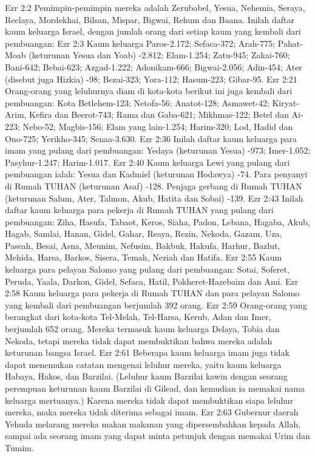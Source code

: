 Ezr 2:2  Pemimpin-pemimpin mereka adalah Zerubabel, Yesua, Nehemia, Seraya, Reelaya, Mordekhai, Bilsan, Mispar, Bigwai, Rehum dan Baana. Inilah daftar kaum keluarga Israel, dengan jumlah orang dari setiap kaum yang kembali dari pembuangan:
Ezr 2:3  Kaum keluarga Paros-2.172; Sefaca-372; Arah-775; Pahat-Moab (keturunan Yesua dan Yoab) -2.812; Elam-1.254; Zatu-945; Zakai-760; Bani-642; Bebai-623; Azgad-1.222; Adonikam-666; Bigwai-2.056; Adin-454; Ater (disebut juga Hizkia) -98; Bezai-323; Yora-112; Hasum-223; Gibar-95.
Ezr 2:21  Orang-orang yang leluhurnya diam di kota-kota berikut ini juga kembali dari pembuangan: Kota Betlehem-123; Netofa-56; Anatot-128; Asmawet-42; Kiryat-Arim, Kefira dan Beerot-743; Rama dan Gaba-621; Mikhmas-122; Betel dan Ai-223; Nebo-52; Magbis-156; Elam yang lain-1.254; Harim-320; Lod, Hadid dan Ono-725; Yerikho-345; Senaa-3.630.
Ezr 2:36  Inilah daftar kaum keluarga para imam yang pulang dari pembuangan: Yedaya (keturunan Yesua) -973; Imer-1.052; Pasyhur-1.247; Harim-1.017.
Ezr 2:40  Kaum keluarga Lewi yang pulang dari pembuangan ialah: Yesua dan Kadmiel (keturunan Hodawya) -74. Para penyanyi di Rumah TUHAN (keturunan Asaf) -128. Penjaga gerbang di Rumah TUHAN (keturunan Salum, Ater, Talmon, Akub, Hatita dan Sobai) -139.
Ezr 2:43  Inilah daftar kaum keluarga para pekerja di Rumah TUHAN yang pulang dari pembuangan: Ziha, Hasufa, Tabaot, Keros, Siaha, Padon, Lebana, Hagaba, Akub, Hagab, Samlai, Hanan, Gidel, Gahar, Reaya, Rezin, Nekoda, Gazam, Uza, Paseah, Besai, Asna, Meunim, Nefusim, Bakbuk, Hakufa, Harhur, Bazlut, Mehida, Harsa, Barkos, Sisera, Temah, Neziah dan Hatifa.
Ezr 2:55  Kaum keluarga para pelayan Salomo yang pulang dari pembuangan: Sotai, Soferet, Peruda, Yaala, Darkon, Gidel, Sefaca, Hatil, Pokheret-Hazebaim dan Ami.
Ezr 2:58  Kaum keluarga para pekerja di Rumah TUHAN dan para pelayan Salomo yang kembali dari pembuangan berjumlah 392 orang.
Ezr 2:59  Orang-orang yang berangkat dari kota-kota Tel-Melah, Tel-Harsa, Kerub, Adan dan Imer, berjumlah 652 orang. Mereka termasuk kaum keluarga Delaya, Tobia dan Nekoda, tetapi mereka tidak dapat membuktikan bahwa mereka adalah keturunan bangsa Israel.
Ezr 2:61  Beberapa kaum keluarga imam juga tidak dapat menemukan catatan mengenai leluhur mereka, yaitu kaum keluarga Habaya, Hakos, dan Barzilai. (Leluhur kaum Barzilai kawin dengan seorang perempuan keturunan kaum Barzilai di Gilead, dan kemudian ia memakai nama keluarga mertuanya.) Karena mereka tidak dapat membuktikan siapa leluhur mereka, maka mereka tidak diterima sebagai imam.
Ezr 2:63  Gubernur daerah Yehuda melarang mereka makan makanan yang dipersembahkan kepada Allah, sampai ada seorang imam yang dapat minta petunjuk dengan memakai Urim dan Tumim.
